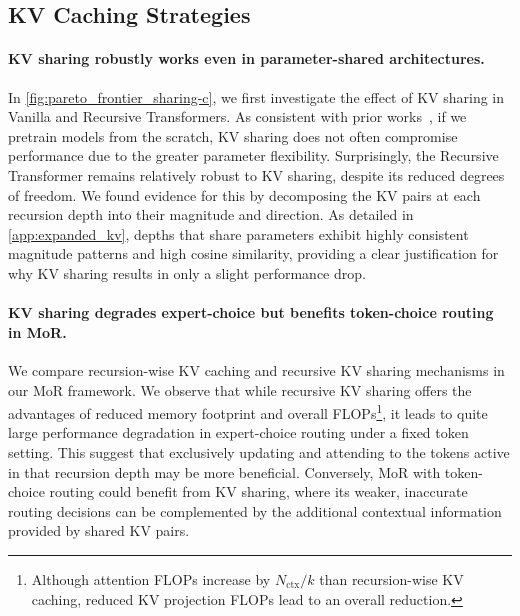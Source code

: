 


\subsection{KV Caching Strategies}
\label{subsec:ablation_kv_cache}


\paragraph{KV sharing robustly works even in parameter-shared architectures.}

In \autoref{fig:pareto_frontier_sharing-c}, we first investigate the effect of KV sharing in Vanilla and Recursive Transformers. As consistent with prior works~\citep{brandon2024reducing, wu2024layer, sun2024you}, if we pretrain models from the scratch, KV sharing does not often compromise performance due to the greater parameter flexibility. Surprisingly, the Recursive Transformer remains relatively robust to KV sharing, despite its reduced degrees of freedom. We found evidence for this by decomposing the KV pairs at each recursion depth into their magnitude and direction. As detailed in \autoref{app:expanded_kv}, depths that share parameters exhibit highly consistent magnitude patterns and high cosine similarity, providing a clear justification for why KV sharing results in only a slight performance drop.


\vspace{-12pt}
\paragraph{KV sharing degrades expert-choice but benefits token-choice routing in MoR.}

We compare recursion-wise KV caching and recursive KV sharing mechanisms in our MoR framework. 
We observe that while recursive KV sharing offers the advantages of reduced memory footprint and overall FLOPs\footnote{Although attention FLOPs increase by $N_{\text{ctx}}/k$ than recursion-wise KV caching, reduced KV projection FLOPs lead to an overall reduction.}, it leads to quite large performance degradation in expert-choice routing under a fixed token setting. This suggest that exclusively updating and attending to the tokens active in that recursion depth may be more beneficial. Conversely, MoR with token-choice routing could benefit from KV sharing, where its weaker, inaccurate routing decisions can be complemented by the additional contextual information provided by shared KV pairs.


